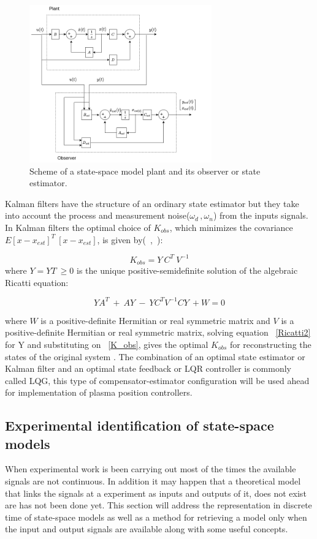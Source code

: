 \begin{figure}[h]
	\centering
	\includegraphics[width=0.7\textwidth]{Chp2/plant_observer.png}
	\caption{ Scheme of a state-space model plant and its observer or state estimator. \label{plant_obser}}
\end{figure}

Kalman filters have the structure of an ordinary state estimator but they take into account the process and measurement noise($\omega_d\,,\omega_n$) from the inputs signals. In Kalman filters the optimal choice of $K_{obs}$, which minimizes  the covariance $E{[x-x_{est}]^T~[x-x_{est}]}$, is given by(~\cite[Chapter~9]{Skogestad},~\cite[Chapter~8]{Hippe2009}):  

\begin{equation}
K_{obs}=Y~C^T~V^{-1}
\label{K_obs}
\end{equation}
 where $Y=Y{ T}~ \geq 0$ is the unique positive-semidefinite solution of the algebraic Ricatti equation:
 
 
\begin{equation}
YA^T~+~AY~-~YC^TV^{-1}CY~+W=0
\label{Ricatti2}
\end{equation}

where $W$ is a positive-definite Hermitian or real symmetric matrix and $V$ is a positive-definite Hermitian or real symmetric matrix, solving equation ~\ref{Ricatti2} for Y and substituting on ~\ref{K_obs}, gives the optimal $K_{obs}$ for reconstructing the states of the original system . The combination of an optimal state estimator or Kalman filter  and an optimal state feedback or LQR controller is commonly called LQG, this type of compensator-estimator configuration will be used ahead for implementation of plasma position controllers. 

\subsection{Experimental identification of state-space models}
\label{data_drivenSec}
When experimental work is been carrying out most of the times the available signals are not continuous. In addition it may happen that a theoretical model that links the signals at a experiment as inputs and outputs of it, does not exist are has not been done yet. This section will address the representation in discrete time of state-space models as well as a method for retrieving a model only when the input and output signals are available  along with some useful concepts.
\smallskip

